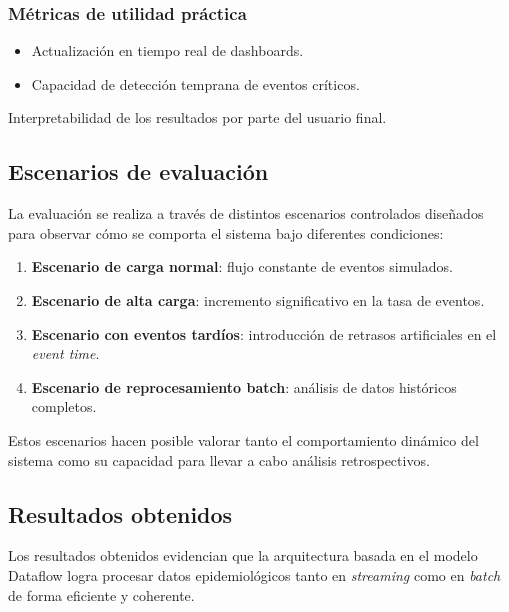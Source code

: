 \documentclass[12pt,a4paper]{article}
\providecommand{\tightlist}{%
  \setlength{\itemsep}{0pt}\setlength{\parskip}{0pt}}
\begin{document}
\subsubsection{Métricas de utilidad práctica}\label{muxe9tricas-de-utilidad-pruxe1ctica}

\begin{itemize}
    \tightlist
    \item
          Actualización en tiempo real de dashboards.
    \item
          Capacidad de detección temprana de eventos críticos.
\end{itemize}

Interpretabilidad de los resultados por parte del usuario final.

\subsection{Escenarios de evaluación}\label{escenarios-de-evaluaciuxf3n}

La evaluación se realiza a través de distintos escenarios controlados diseñados para observar cómo se comporta el sistema bajo diferentes condiciones:

\begin{enumerate}

    \tightlist
    \item
          \textbf{Escenario de carga normal}: flujo constante de eventos simulados.
    \item
          \textbf{Escenario de alta carga}: incremento significativo en la tasa de eventos.
    \item
          \textbf{Escenario con eventos tardíos}: introducción de retrasos artificiales en el \emph{event time}.
    \item
          \textbf{Escenario de reprocesamiento batch}: análisis de datos históricos completos.
\end{enumerate}

Estos escenarios hacen posible valorar tanto el comportamiento dinámico del sistema como su capacidad para llevar a cabo análisis retrospectivos.

\subsection{Resultados obtenidos}\label{resultados-obtenidos}

Los resultados obtenidos evidencian que la arquitectura basada en el modelo Dataflow logra procesar datos epidemiológicos tanto en \emph{streaming} como en \emph{batch} de forma eficiente y coherente.
\end{document}
